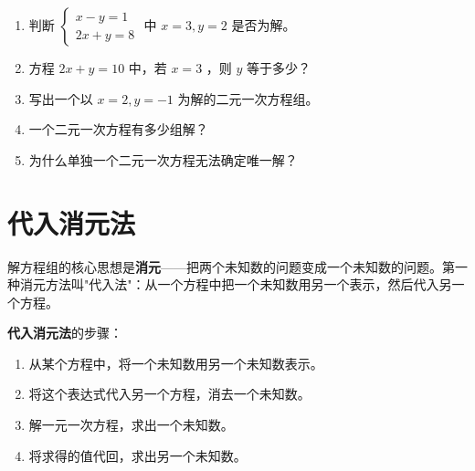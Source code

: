 \begin{practice}


\begin{enumerate}
  \item 判断 $\begin{cases} x - y = 1 \\ 2x + y = 8 \end{cases}$ 中 $x = 3, y = 2$ 是否为解。
  \item 方程 $2x + y = 10$ 中，若 $x = 3$ ，则 $y$ 等于多少？
  \item 写出一个以 $x = 2, y = -1$ 为解的二元一次方程组。
  \item 一个二元一次方程有多少组解？
  \item 为什么单独一个二元一次方程无法确定唯一解？
\end{enumerate}


\end{practice}

\section*{代入消元法}


\begin{explore}


解方程组的核心思想是\textbf{消元}——把两个未知数的问题变成一个未知数的问题。第一种消元方法叫"代入法"：从一个方程中把一个未知数用另一个表示，然后代入另一个方程。

\end{explore}

\begin{understand}


\textbf{代入消元法}的步骤：

\begin{enumerate}
  \item 从某个方程中，将一个未知数用另一个未知数表示。
  \item 将这个表达式代入另一个方程，消去一个未知数。
  \item 解一元一次方程，求出一个未知数。
  \item 将求得的值代回，求出另一个未知数。
\end{enumerate}


\end{understand}

